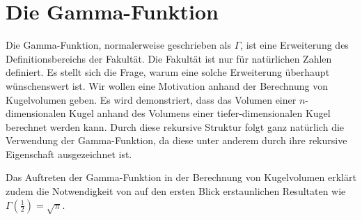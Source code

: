 %
%
%
%
\chapter{Die Gamma-Funktion\label{chapter:gamma}}
\begin{refsection}

%
%
%
%


\noindent
Die Gamma-Funktion, normalerweise geschrieben als $\Gamma$, ist eine Erweiterung des Definitionsbereichs der Fakultät.
%
Die Fakultät ist nur für natürlichen Zahlen definiert.
Es stellt sich die Frage, warum eine solche Erweiterung überhaupt wünschenswert ist.
Wir wollen eine Motivation anhand der Berechnung von Kugelvolumen geben.
Es wird demonstriert, dass das Volumen einer $n$-dimensionalen Kugel anhand des Volumens einer tiefer-dimensionalen Kugel berechnet werden kann.
Durch diese rekursive Struktur folgt ganz natürlich die Verwendung der Gamma-Funktion,
da diese unter anderem durch ihre rekursive Eigenschaft ausgezeichnet ist.

Das Auftreten der Gamma-Funktion in der Berechnung von Kugelvolumen erklärt zudem die Notwendigkeit von auf den ersten Blick erstaunlichen Resultaten wie
%
$\Gamma(\frac{1}{2}) = \sqrt{\pi}$.






\printbibliography[heading=subbibliography]
\end{refsection}
